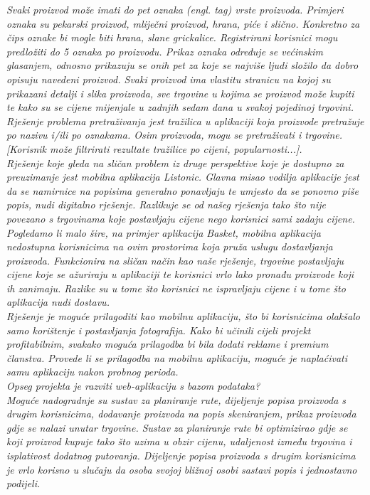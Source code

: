 		\textit{Svaki proizvod može imati do pet oznaka (engl. tag) vrste proizvoda. Primjeri oznaka su pekarski proizvod, mliječni proizvod, hrana, piće i slično. Konkretno za čips oznake bi mogle biti hrana, slane grickalice. Registrirani korisnici mogu predložiti do 5 oznaka po proizvodu. Prikaz oznaka određuje se većinskim glasanjem, odnosno prikazuju se onih pet za koje se najviše ljudi složilo da dobro opisuju navedeni proizvod. Svaki proizvod ima vlastitu stranicu na kojoj su prikazani detalji i slika proizvoda, sve trgovine u kojima se proizvod može kupiti te kako su se cijene mijenjale u zadnjih sedam dana u svakoj pojedinoj trgovini.}\\
		
		\textit{Rješenje problema pretraživanja jest tražilica u aplikaciji koja proizvode pretražuje po nazivu i/ili po oznakama. Osim proizvoda, mogu se pretraživati i trgovine. [Korisnik može filtrirati rezultate tražilice po cijeni, popularnosti...].}\\
		
		\textit{Rješenje koje gleda na sličan problem iz druge perspektive koje je dostupno za preuzimanje jest mobilna aplikacija Listonic. Glavna misao vodilja aplikacije jest da se namirnice na popisima generalno ponavljaju te umjesto da se ponovno piše popis, nudi digitalno rješenje. Razlikuje se od našeg rješenja tako što nije povezano s trgovinama koje postavljaju cijene nego korisnici sami zadaju cijene. Pogledamo li malo šire, na primjer aplikacija Basket, mobilna aplikacija nedostupna korisnicima na ovim prostorima koja pruža uslugu dostavljanja proizvoda. Funkcionira na sličan način kao naše rješenje, trgovine postavljaju cijene koje se ažuriraju u aplikaciji te korisnici vrlo lako pronađu proizvode koji ih zanimaju. Razlike su u tome što korisnici ne ispravljaju cijene i u tome što aplikacija nudi dostavu.}\\
		
		\textit{Rješenje je moguće prilagoditi kao mobilnu aplikaciju, što bi korisnicima olakšalo samo korištenje i postavljanja fotografija. Kako bi učinili cijeli projekt profitabilnim, svakako moguća prilagodba bi bila dodati reklame i premium članstva. Provede li se prilagodba na mobilnu aplikaciju, moguće je naplaćivati samu aplikaciju nakon probnog perioda.}\\
		
		\textit{Opseg projekta je razviti web-aplikaciju s bazom podataka?}\\
		
		\textit{Moguće nadogradnje su sustav za planiranje rute, dijeljenje popisa proizvoda s drugim korisnicima, dodavanje proizvoda na popis skeniranjem, prikaz proizvoda gdje se nalazi unutar trgovine. Sustav za planiranje rute bi optimizirao gdje se koji proizvod kupuje tako što uzima u obzir cijenu, udaljenost između trgovina i isplativost dodatnog putovanja. Dijeljenje popisa proizvoda s drugim korisnicima je vrlo korisno u slučaju da osoba svojoj bližnoj osobi sastavi popis i jednostavno podijeli.}\\
		


